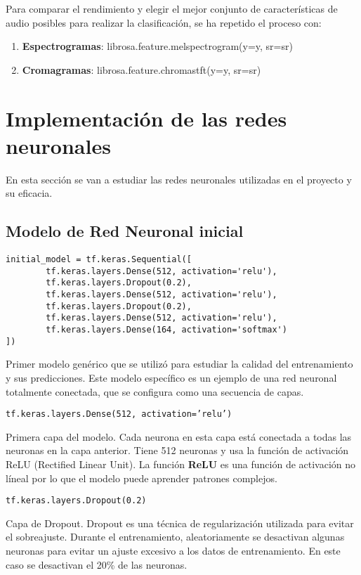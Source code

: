 Para comparar el rendimiento y elegir el mejor conjunto de características de audio posibles para realizar la clasificación, se ha repetido el proceso con:

\begin{enumerate}
\item \textbf{Espectrogramas}: librosa.feature.melspectrogram(y=y, sr=sr)

\item \textbf{Cromagramas}: librosa.feature.chroma\textunderscore stft(y=y, sr=sr)
\end{enumerate}

\newpage

\section{Implementación de las redes neuronales}

En esta sección se van a estudiar las redes neuronales utilizadas en el proyecto y su eficacia.

\subsection{Modelo de Red Neuronal inicial}

\begin{verbatim}
initial_model = tf.keras.Sequential([
        tf.keras.layers.Dense(512, activation='relu'),
        tf.keras.layers.Dropout(0.2),
        tf.keras.layers.Dense(512, activation='relu'),
        tf.keras.layers.Dropout(0.2),
        tf.keras.layers.Dense(512, activation='relu'),
        tf.keras.layers.Dense(164, activation='softmax')
])
\end{verbatim}

Primer modelo genérico que se utilizó para estudiar la calidad del entrenamiento y sus predicciones.
Este modelo específico es un ejemplo de una red neuronal totalmente conectada, que se configura como una secuencia de capas.

\texttt{tf.keras.layers.Dense(512, activation='relu')}

Primera capa del modelo. Cada neurona en esta capa está conectada a todas las neuronas en la capa anterior. Tiene 512 neuronas y usa la función de activación ReLU (Rectified Linear Unit). La función \textbf{ReLU} es una función de activación no líneal por lo que el modelo puede aprender patrones complejos.

\texttt{tf.keras.layers.Dropout(0.2)}

Capa de Dropout. Dropout es una técnica de regularización utilizada para evitar el sobreajuste. Durante el entrenamiento, aleatoriamente se desactivan algunas neuronas para evitar un ajuste excesivo a los datos de entrenamiento. En este caso se desactivan el 20\% de las neuronas.

